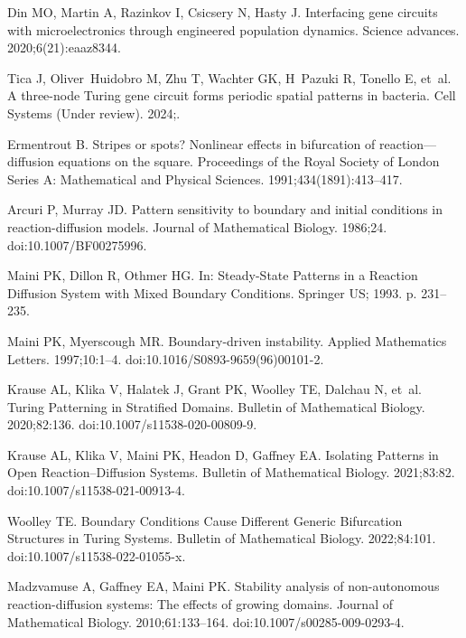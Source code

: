 \documentclass[10pt,letterpaper]{article}
\begin{document}
\begin{thebibliography}{10}
	Din MO, Martin A, Razinkov I, Csicsery N, Hasty J.
	\newblock Interfacing gene circuits with microelectronics through engineered
	population dynamics.
	\newblock Science advances. 2020;6(21):eaaz8344.
	
	Tica J, Oliver~Huidobro M, Zhu T, Wachter GK, H~Pazuki R, Tonello E, et~al.
	\newblock A three-node Turing gene circuit forms periodic spatial patterns in
	bacteria.
	\newblock Cell Systems (Under review). 2024;.
	
	Ermentrout B.
	\newblock Stripes or spots? Nonlinear effects in bifurcation of
	reaction—diffusion equations on the square.
	\newblock Proceedings of the Royal Society of London Series A: Mathematical and
	Physical Sciences. 1991;434(1891):413--417.
	
	Arcuri P, Murray JD.
	\newblock Pattern sensitivity to boundary and initial conditions in
	reaction-diffusion models.
	\newblock Journal of Mathematical Biology. 1986;24.
	\newblock doi:{10.1007/BF00275996}.
	
	Maini PK, Dillon R, Othmer HG.
	\newblock In: Steady-State Patterns in a Reaction Diffusion System with Mixed
	Boundary Conditions. Springer US; 1993. p. 231--235.
	
	Maini PK, Myerscough MR.
	\newblock Boundary-driven instability.
	\newblock Applied Mathematics Letters. 1997;10:1--4.
	\newblock doi:{10.1016/S0893-9659(96)00101-2}.
	
	Krause AL, Klika V, Halatek J, Grant PK, Woolley TE, Dalchau N, et~al.
	\newblock Turing Patterning in Stratified Domains.
	\newblock Bulletin of Mathematical Biology. 2020;82:136.
	\newblock doi:{10.1007/s11538-020-00809-9}.
	
	Krause AL, Klika V, Maini PK, Headon D, Gaffney EA.
	\newblock Isolating Patterns in Open Reaction–Diffusion Systems.
	\newblock Bulletin of Mathematical Biology. 2021;83:82.
	\newblock doi:{10.1007/s11538-021-00913-4}.
	
	Woolley TE.
	\newblock Boundary Conditions Cause Different Generic Bifurcation Structures in
	Turing Systems.
	\newblock Bulletin of Mathematical Biology. 2022;84:101.
	\newblock doi:{10.1007/s11538-022-01055-x}.
	
	Madzvamuse A, Gaffney EA, Maini PK.
	\newblock Stability analysis of non-autonomous reaction-diffusion systems: The
	effects of growing domains.
	\newblock Journal of Mathematical Biology. 2010;61:133--164.
	\newblock doi:{10.1007/s00285-009-0293-4}.
	

\end{thebibliography}
\end{document}
